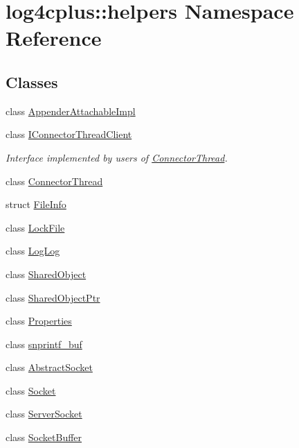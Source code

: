 \hypertarget{namespacelog4cplus_1_1helpers}{\section{log4cplus\-:\-:helpers Namespace Reference}
\label{namespacelog4cplus_1_1helpers}
}
\subsection*{Classes}
\begin{DoxyCompactItemize}
\item 
class \hyperlink{classlog4cplus_1_1helpers_1_1AppenderAttachableImpl}{Appender\-Attachable\-Impl}
\item 
class \hyperlink{classlog4cplus_1_1helpers_1_1IConnectorThreadClient}{I\-Connector\-Thread\-Client}
\begin{DoxyCompactList}\small\item\em Interface implemented by users of \hyperlink{classlog4cplus_1_1helpers_1_1ConnectorThread}{Connector\-Thread}. \end{DoxyCompactList}\item 
class \hyperlink{classlog4cplus_1_1helpers_1_1ConnectorThread}{Connector\-Thread}
\item 
struct \hyperlink{structlog4cplus_1_1helpers_1_1FileInfo}{File\-Info}
\item 
class \hyperlink{classlog4cplus_1_1helpers_1_1LockFile}{Lock\-File}
\item 
class \hyperlink{classlog4cplus_1_1helpers_1_1LogLog}{Log\-Log}
\item 
class \hyperlink{classlog4cplus_1_1helpers_1_1SharedObject}{Shared\-Object}
\item 
class \hyperlink{classlog4cplus_1_1helpers_1_1SharedObjectPtr}{Shared\-Object\-Ptr}
\item 
class \hyperlink{classlog4cplus_1_1helpers_1_1Properties}{Properties}
\item 
class \hyperlink{classlog4cplus_1_1helpers_1_1snprintf__buf}{snprintf\-\_\-buf}
\item 
class \hyperlink{classlog4cplus_1_1helpers_1_1AbstractSocket}{Abstract\-Socket}
\item 
class \hyperlink{classlog4cplus_1_1helpers_1_1Socket}{Socket}
\item 
class \hyperlink{classlog4cplus_1_1helpers_1_1ServerSocket}{Server\-Socket}
\item 
class \hyperlink{classlog4cplus_1_1helpers_1_1SocketBuffer}{Socket\-Buffer}

\end{DoxyCompactItemize}
